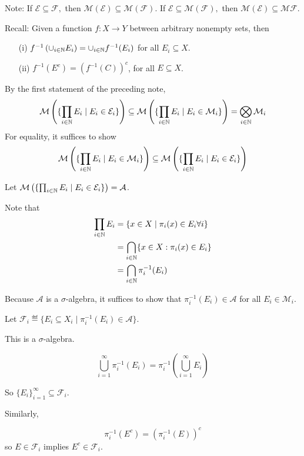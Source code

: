 \documentclass[x11names,reqno,14pt]{extarticle}
\begin{document}
Note: If $\mathcal{E}\subseteq \mathcal{F},$ then $\mathcal{M}(\mathcal{E}) \subseteq \mathcal{M}(\mathcal{F})$. 
If $\mathcal{E} \subseteq \mathcal{M}(\mathcal{F}),$ then $\mathcal{M}(\mathcal{E}) \subseteq \mathcal{M}\mathcal{F}$.

Recall: Given a function $f:X\to Y$ between arbitrary nonempty sets, then 
\begin{itemize}
\item[(i)] $f^{-1}\left(\cup_{i\in\mathbb{N}}E_i\right) = \cup_{i\in\mathbb{N}}f^{-1}(E_i)$ for all $E_i \subseteq X$. 
\item[(ii)] $f^{-1}(E^c) = (f^{-1}(C))^c$, for all $E \subseteq X$. 
\end{itemize}

\proof By the first statement of the preceding note, 
\[
\mathcal{M}\left(\{\prod_{i\in\mathbb{N}}E_i \mid E_i \in \mathcal{E}_i\}\right) \subseteq \mathcal{M}\left(\{\prod_{i\in\mathbb{N}}E_i \mid E_i \in \mathcal{M}_i\}\right) = \bigotimes_{i\in\mathbb{N}}\mathcal{M}_i
\]
For equality, it suffices to show
\[
\mathcal{M}\left(\{\prod_{i\in\mathbb{N}}E_i \mid E_i \in \mathcal{M}_i\}\right) \subseteq \mathcal{M}\left(\{\prod_{i\in\mathbb{N}}E_i \mid E_i \in \mathcal{E}_i\}\right)
\]

Let $\mathcal{M}\left(\{\prod_{i\in\mathbb{N}}E_i \mid E_i \in \mathcal{E}_i\}\right) = \mathcal{A}$.

Note that 
\begin{align*}
\prod_{i\in\mathbb{N}}E_i  &= \{x \in X \mid \pi_i(x) \in E_i\forall i\} \\ & = \bigcap_{i\in\mathbb{N}}\{x \in X: \pi_i(x) \in E_i\} \\
 & = \bigcap_{i\in\mathbb{N}}\pi_i^{-1}(E_i) \\
\end{align*}

Because $\mathcal{A}$ is a $\sigma$-algebra, it suffices to show that $\pi_i^{-1}(E_i) \in \mathcal{A}$ for all $E_i \in \mathcal{M}_i$. 

\claim Let $\mathcal{F}_i \eqdef \{E_i \subseteq X_i \mid \pi_i^{-1}(E_i) \in \mathcal{A}\}$.

This is a $\sigma$-algebra. 

\proof

\[
\bigcup_{i=1}^\infty \pi_i^{-1}(E_i) = \pi_i^{-1}(\bigcup_{i=1}^\infty E_i)
\]

So $\{E_i\}_{i=1}^\infty \subseteq \mathcal{F}_i$. 

Similarly, 

\[
\pi_i^{-1}(E^c) = (\pi_i^{-1}(E))^c
\]
so $E \in \mathcal{F}_i$ implies $E^c \in \mathcal{F}_i$.
\end{document}
